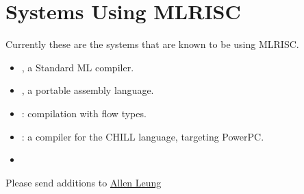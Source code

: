 \section{Systems Using MLRISC}
Currently these are the systems that are known to be using MLRISC.
\begin{itemize}
\item {},
a Standard ML compiler.  
\item {},
a portable assembly language.
\item {}:
compilation with flow types.
\item {}:
a compiler for the CHILL language, targeting PowerPC.
\item {}
\end{itemize}

\begin{small}
Please send additions to \href{mailto:leunga@cs.nyu.edu}{Allen Leung} 
\end{small}
